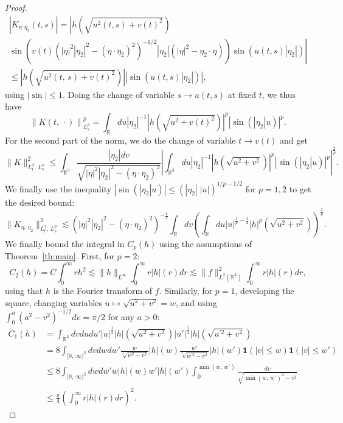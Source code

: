\documentclass[10pt]{amsart}
\theoremstyle{definition}\newtheorem{defi}[theo]{Definition}\newtheorem{rema}[theo]{Remark}\newtheorem{exam}[theo]{Example}\newtheorem{exem}[theo]{Example}\newtheorem{nota}[theo]{Notation}
\newcommand{\R}{\mathbb{R}}
\newcommand{\bfun}{\mathbf{1}}
\begin{document}
\begin{proof}
\begin{multline*}
\left|K_{\eta_,\,\eta_2}(t,s)\right| 
=\left|h\left(\sqrt{u^2(t,s)+v(t)^2}\right)\right.\\
\left.\sin\left(v(t)\left(|\eta|^2|\eta_2|^2- \left(\eta\cdot\eta_2\right)^2\right)^{-1/2}|\eta_2|\left(|\eta|^2-\eta_2\cdot \eta\right)\right) \sin\left(u(t,s)|\eta_2|\right)\right|\\
\leq \left|h\left(\sqrt{u^2(t,\,s)+v(t)^2}\right)\right| \left|\sin\left(u(t,s)|\eta_2|\right)\right|,
\end{multline*}
using $|\sin|\leq 1$. Doing the change of variable $s \rightarrow u(t,s)$ at fixed $t$, we thus have
\[
\left\|K(t,\,\cdot)\right\|_{L^p_s}^p = \int_{\R} du |\eta_2|^{-1} \left|h\left(\sqrt{u^2+ v(t)^2}\right)\right|^p \left|\sin\left(|\eta_2| u\right)\right|^p.
\]
For the second part of the norm, we do the change of variable $t\rightarrow v(t)$ and get
\[
\|K\|_{L^2_t,\,L^p_s}^2 \leq \int_{\R^3} \frac{|\eta_2|dv}{\sqrt{|\eta|^2|\eta_2|^2- \left(\eta\cdot\eta_2\right)^2}} \left| \int_{\R^3} du |\eta_2|^{-1}\left|h\left(\sqrt{u^2+v^2}\right)\right|^p \left|\sin \left(|\eta_2|u\right)\right|^p \right|^{\frac 2p}.
\]
We finally use the inequality $|\sin (|\eta_2|u)| \leq (|\eta_2| \;|u|)^{1/p-1/2}$ for $p=1,2$ to get the desired bound:
\[
\big\|K_{\eta,\,\eta_2}\big\|_{L^2_t,\,L^p_s}^2 \lesssim \left(|\eta|^2|\eta_2|^2 - \left(\eta\cdot\eta_2\right)^2\right)^{-\frac 12}\int_{\R} dv \left(\int_{\R} du |u|^{\frac 1p-\frac 12}\left|h\right|^p\left(\sqrt{u^2+v^2}\right) \right)^{\frac 2p}.
\]
We finally bound the integral in $C_p(h)$ using the assumptions of Theorem~\ref{th:main}. First, for $p=2$:
\[
C_2(h)=C \int_0^\infty r h^2\lesssim \| h \|_{L^{\infty}}\int_0^\infty r|h|(r)dr \lesssim \| f\|_{L^2(\R^3)}^2\int_0^\infty r|h|(r)dr,
\]
using that $h$ is the Fourier transform of $f$. Similarly, for $p=1$, developing the square, changing variables $u\mapsto \sqrt{u^2+v^2}=w$, and using $\int_0^a (a^2-v^2)^{-1/2}dv=\pi/2$ for any $a>0$:
\begin{align*}
 C_1(h)&=\int_{\R^3} dvdudu' |u|^{\frac 12}|h|\left(\sqrt{u^2+v^2}\right)|u'|^{\frac 12}|h|\left(\sqrt{u^{'2}+v^2}\right)\\
&= 8 \int_{[0,\,\infty)^3} dvdwdw' \frac{w}{\sqrt[4]{w^2-v^2}}|h|(w)\frac{w'}{\sqrt[4]{w^{'2}-v^2}}|h|(w')\bfun(|v|\leq w)\bfun(|v|\leq w')\\
&\leq 8 \int_{[0,\,\infty)^2} dwdw' w|h|(w)w'|h|(w') \int_0^{\min(w,\,w')}\frac{dv}{\sqrt{\min(w,\,w')^2-v^2}}\\
&\leq \frac{\pi}{4} \left(\int_0^\infty r|h|(r)dr\right)^2.
\end{align*}
\end{proof}
\end{document}
